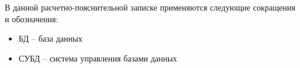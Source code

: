 
В данной расчетно-пояснительной записке применяются следующие сокращения и обозначения:
\begin{itemize}[label=]
	\item БД -- база данных
	\item СУБД -- система управления базами данных
	
\end{itemize}

\clearpage